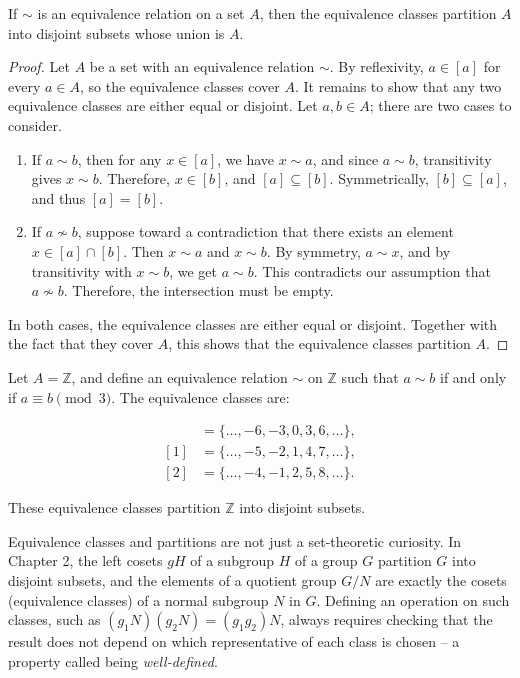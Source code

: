 \begin{theorem}
If $\sim$ is an equivalence relation on a set $A$, then the equivalence classes partition $A$ into disjoint subsets whose union is $A$.
\end{theorem}

\begin{proof}
Let $A$ be a set with an equivalence relation $\sim$. By reflexivity, $a \in [a]$ for every $a \in A$, so the equivalence classes cover $A$. It remains to show that any two equivalence classes are either equal or disjoint. Let $a, b \in A$; there are two cases to consider.

\begin{enumerate}

\item If $a \sim b$, then for any $x \in [a]$, we have $x \sim a$, and since $a \sim b$, transitivity gives $x \sim b$. Therefore, $x \in [b]$, and $[a] \subseteq [b]$. Symmetrically, $[b] \subseteq [a]$, and thus $[a] = [b]$.

\item If $a \not\sim b$, suppose toward a contradiction that there exists an element $x \in [a] \cap [b]$. Then $x \sim a$ and $x \sim b$. By symmetry, $a \sim x$, and by transitivity with $x \sim b$, we get $a \sim b$. This contradicts our assumption that $a \not \sim b$. Therefore, the intersection must be empty.

\end{enumerate}

In both cases, the equivalence classes are either equal or disjoint. Together with the fact that they cover $A$, this shows that the equivalence classes partition $A$.
\end{proof}

\begin{example}
Let $A = \mathbb{Z}$, and define an equivalence relation $\sim$ on $\mathbb{Z}$ such that $a \sim b$ if and only if $a \equiv b \pmod{3}$. The equivalence classes are:

\begin{align*}
[0] &= \{\dots, -6, -3, 0, 3, 6, \dots\}, \\
[1] &= \{\dots, -5, -2, 1, 4, 7, \dots\}, \\
[2] &= \{\dots, -4, -1, 2, 5, 8, \dots\}.
\end{align*}

These equivalence classes partition $\mathbb{Z}$ into disjoint subsets.
\end{example}

Equivalence classes and partitions are not just a set-theoretic curiosity. In Chapter 2, the left cosets $gH$ of a subgroup $H$ of a group $G$ partition $G$ into disjoint subsets, and the elements of a quotient group $G/N$ are exactly the cosets (equivalence classes) of a normal subgroup $N$ in $G$. Defining an operation on such classes, such as $(g_1N)(g_2N) = (g_1g_2)N$, always requires checking that the result does not depend on which representative of each class is chosen -- a property called being \textit{well-defined}.

